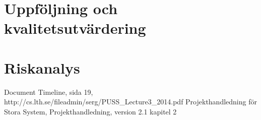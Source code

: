 \documentclass[a4paper]{article}
\begin{document}
\section{Uppföljning och kvalitetsutvärdering}
\begin{comment} 
Det ska finnas en del i projektplanen som beskriver hur uppföljning, tex av tidsplanen, sker under projektet, samt vad som händer om arbetet inte verkar gå enligt plan. Det ska också finnas en beskrivning av de rutiner som finns för kvalitetsutvärdering under projektet.

\end{comment}

\section{Riskanalys}
\begin{comment}
I projektplanen ska även resultatet av en riskanalys för projektet presenteras. Ange hur riskanalys utförts i projektet, samt de viktigaste riskerna som identifierats. Rapportera åtminstone följande för varje rapporterad risk: skattad sannolikhet (tex låg, medel, hög), skattad effekt (tex låg, medel, hög), möjliga indikationer på att risken förverkligas, samt exempel på lösningar om risken förverkligas.

\end{comment}
\newpage

\begin{thebibliography}{1}
 Document Timeline, sida 19, http://cs.lth.se/fileadmin/serg/PUSS\_Lecture3\_2014.pdf 
 Projekthandledning för Stora System, Projekthandledning, version 2.1 kapitel 2
\end{thebibliography}
\end{document}

